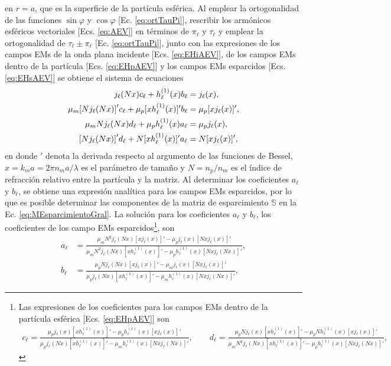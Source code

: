 \noindent en $r =a$, que es la superficie de la partícula esférica. Al emplear la ortogonalidad de las funciones $\sin\varphi$ y $\cos\varphi$ [Ec. \eqref{eq:ortTauPi}], rescribir los armónicos esféricos vectoriales [Ecs. \eqref{eq:AEV}] en términos de $\pi_\ell$ y $\tau_\ell$ y emplear la ortogonalidad de $\tau_\ell\pm\pi_\ell$ [Ec. \eqref{eq:ortTauPi}], junto con las expresiones de los campos EMs de la onda plana incidente [Ecs. \eqref{eq:EHiAEV}], de los campos EMs dentro de la partícula [Ecs. \eqref{eq:EHpAEV}] y los campos EMs esparcidos [Ecs. \eqref{eq:EHsAEV}] se obtiene el sistema de ecuaciones
	\begin{align*}
	j_\ell(Nx)c_\ell + h_\ell^{(1)}(x)b_\ell &= j_\ell(x),\\
	\mu_m\qty[Nj_\ell(Nx)]'c_\ell + \mu_p [xh_\ell^{(1)}(x)]'b_\ell &= \mu_p [xj_\ell(x)]',\\
	\mu_m N j_\ell(Nx)d_\ell +\mu_p h_\ell^{(1)}(x)a_\ell &=\mu_p j_\ell(x),\\
	\qty[Nj_\ell(Nx)]'d_\ell + N [xh_\ell^{(1)}(x)]'a_\ell &= N [xj_\ell(x)]',
	\end{align*}
en donde $'$ denota la derivada respecto al argumento de las funciones de Bessel, $x = k_m a = 2 \pi n_m a /\lambda$ es el parámetro de tamaño y $N = n_p / n_m$ es el índice de refracción relativo entre la partícula y la matriz. Al determinar los coeficientes $a_\ell$ y $b_\ell$, se obtiene una expresión analítica para los campos EMs esparcidos, por lo que es posible determinar las componentes de la matriz de esparcimiento $\mathbb{S}$ en la Ec. \eqref{eq:MEsparcimientoGral}. La solución para los coeficientes $a_\ell$ y $b_\ell$, los coeficientes de los campo EMs esparcidos\footnote{Las expresiones de los coeficientes para los campos EMs dentro de la partícula esférica [Ecs. \eqref{eq:EHpAEV}] son 
	\begin{align*}
	c_\ell = \frac{\mu_p j_\ell(x)[xh_\ell^{(1)}(x)]' - \mu_p h_\ell^{(1)}(x) [xj_\ell(x)]'}
				{\mu_pj_\ell(Nx) [xh_\ell^{(1)}(x)]'-\mu_m h_\ell^{(1)}(x) [N x j_\ell(Nx)]' },
	\qquad	
	d_\ell = \frac{\mu_p N j_\ell(x)[xh_\ell^{(1)}(x)]' - \mu_p N h_\ell^{(1)}(x) [xj_\ell(x)]'}
				{\mu_m N^2 j_\ell(Nx) [xh_\ell^{(1)}(x)]'-\mu_p h_\ell^{(1)}(x) [N x j_\ell(Nx)]' }	,
	\end{align*}}, son 
	\begin{subequations}\begin{align}
	a_\ell &= \frac{\mu_m N^2 j_\ell(Nx)[xj_\ell(x)]' - \mu_p j_\ell(x) [Nxj_\ell(x)]'}
				{\mu_mN^2j_\ell(Nx) [xh_\ell^{(1)}(x)]'-\mu_p h_\ell^{(1)}(x) [N x j_\ell(Nx)]' },
	\label{eq:a_ellFULL}\\
	b_\ell &= \frac{\mu_p N j_\ell(Nx)[xj_\ell(x)]' - \mu_m j_\ell(x) [Nxj_\ell(x)]'}
				{\mu_p j_\ell(Nx) [xh_\ell^{(1)}(x)]'-\mu_m h_\ell^{(1)}(x) [N x j_\ell(Nx)]' },
	\label{eq:b_ellFULL}			
	\end{align}\label{eq:MieCoefScattFULL}\end{subequations}
